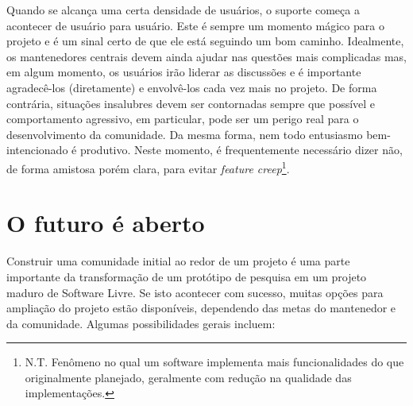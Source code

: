 Quando se alcança uma certa densidade de usuários, o suporte começa a acontecer de
usuário para usuário. Este é sempre um momento mágico para o projeto e é um sinal
certo de que ele está seguindo um bom caminho. Idealmente, os mantenedores centrais
devem ainda ajudar nas questões mais complicadas mas, em algum momento, os usuários
irão liderar as discussões e é importante agradecê-los (diretamente) e envolvê-los
cada vez mais no projeto. De forma contrária, situações insalubres devem ser contornadas
sempre que possível e comportamento agressivo, em particular, pode ser um perigo real
para o desenvolvimento da comunidade. Da mesma forma, nem todo entusiasmo bem-intencionado
é produtivo. Neste momento, é frequentemente necessário dizer não, de forma amistosa porém
clara, para evitar \textit{feature creep}\footnote{N.T. Fenômeno no qual um software
implementa mais funcionalidades do que originalmente planejado, geralmente com redução
na qualidade das implementações.}.

\section*{O futuro é aberto}

Construir uma comunidade initial ao redor de um projeto é uma parte importante
da transformação de um protótipo de pesquisa em um projeto maduro de Software Livre.
Se isto acontecer com sucesso, muitas opções para ampliação do projeto estão disponíveis,
dependendo das metas do mantenedor e da comunidade. Algumas possibilidades gerais incluem:

